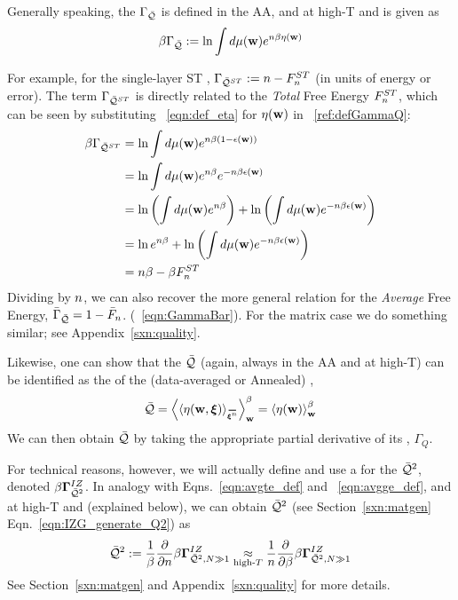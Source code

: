Generally speaking, the \Quality \GeneratingFunction $\Gamma_{\bar{\mathcal{Q}}}$ is defined in the AA, and at high-T and is given as
\begin{align}
  \label{ref:defGammaQ}
  \beta\Gamma_{\bar{\mathcal{Q}}} := \ln\int d\mu({\mathbf{w}}) e^{n\beta\eta({\mathbf{w}})}
\end{align}

For example, for the single-layer ST \Perceptron, $\Gamma_{\bar{\mathcal{Q}}^{ST}}:=n-F^{ST}_{n}$
(in units of energy or error).
The term $\Gamma_{\bar{\mathcal{Q}}^{ST}}$ is directly related to the \emph{Total} Free Energy $F^{ST}_{n}$, which can be seen by substituting \EQN~\ref{eqn:def_eta}
for $\eta({\mathbf{w}})$ in \EQN~\ref{ref:defGammaQ}:
\begin{align}
  \label{ref:defGammaQtoF}
  \beta\Gamma_{\bar{\mathcal{Q}}^{ST}}
  &= \ln\int d\mu({\mathbf{w}}) e^{n\beta(1-\epsilon({\mathbf{w}}))} \nonumber \\
    &= \ln\int d\mu({\mathbf{w}}) e^{n\beta}e^{-n\beta\epsilon({\mathbf{w}})} \nonumber \\
    &= \ln\left(\int d\mu({\mathbf{w}}) e^{n\beta}\right)+\ln\left(\int d\mu({\mathbf{w}})e^{-n\beta\epsilon({\mathbf{w}})}\right) \nonumber \\
   &= \ln e^{n\beta}+\ln\left(\int d\mu({\mathbf{w}})e^{-n\beta\epsilon({\mathbf{w}})}\right) \nonumber \\
  &= n\beta -\beta F^{ST}_{n}
\end{align}
Dividing by $n$, we can also recover the more general relation for the \emph{Average} Free Energy,
$\bar{\Gamma}_{\bar{\mathcal{Q}}}=1-\bar{F}_{n}$. (\EQN~\ref{eqn:GammaBar}). For the matrix case we do something similar; see Appendix~\ref{sxn:quality}.

Likewise, one can show that the \Quality $\bar{\mathcal{Q}}$
(again, always in the AA and at high-T) can be identified as the \ThermalAverage of the (data-averaged or Annealed)
\SelfOverlap, 
\begin{align}
  \label{eqn:Q_def_eta}
  \Q = \THRMAVGw{\langle\ETA(\WVEC,\XI)\rangle_{\AVGNDXIn}} =\THRMAVGw{\ETA(\WVEC)}
\end{align}
We can then obtain $\bar{\mathcal{Q}}$ by taking the appropriate partial derivative of its \GeneratingFunction, $\Gamma_{Q}$.

For technical reasons, however, we will actually define and use a
\GeneratingFunction for the \AverageLayerQualitySquared $\bar{\mathcal{Q}}^{2}$, denoted $\beta\mathbf{\Gamma}^{IZ}_{\bar{\mathcal{Q}}^{2}}$.
In analogy with Eqns.~\ref{eqn:avgte_def} and ~\ref{eqn:avgge_def}, and at high-T and \LargeN (explained below),
we can obtain $\bar{\mathcal{Q}}^{2}$ (see Section~\ref{sxn:matgen} Eqn.~\ref{eqn:IZG_generate_Q2}) as
\begin{align}
  \label{eqn:QT_def}
  \bar{\mathcal{Q}}^{2} := \frac{1}{\beta}\frac{\partial }{\partial n}\beta\mathbf{\Gamma}^{IZ}_{\bar{\mathcal{Q}}^{2},N\gg 1}
  \underset{\text{high-}T}{\approx}
\frac{1}{n}\frac{\partial }{\partial \beta}\beta\mathbf{\Gamma}^{IZ}_{\bar{\mathcal{Q}}^{2},N\gg 1}
\end{align}
See Section~\ref{sxn:matgen} and Appendix~\ref{sxn:quality} for more details.


